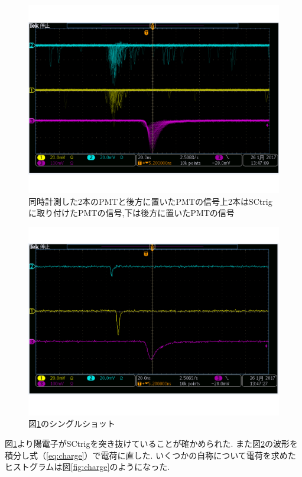 \begin{figure}[tbp]
\centering
\includegraphics[keepaspectratio,scale=0.3]{fig/ybm/oscillo.pdf}
\caption[poaskdf]{同時計測した2本のPMTと後方に置いたPMTの信号\newline 上2本はSCtrigに取り付けたPMTの信号,下は後方に置いたPMTの信号}
\label{fig:oscillo}
\end{figure}
\begin{figure}[tbp]
\centering
\includegraphics[keepaspectratio,scale=0.3]{fig/ybm/oscillo1.pdf}
\caption{図\ref{fig:oscillo}のシングルショット}
\label{fig:oscillo1}
\end{figure}

図\ref{fig:oscillo}より陽電子がSCtrigを突き抜けていることが確かめられた.
また図\ref{fig:oscillo1}の波形を積分し式（\ref{eq:charge}）で電荷に直した.
いくつかの自称について電荷を求めたヒストグラムは図\ref{fig:charge}のようになった.

